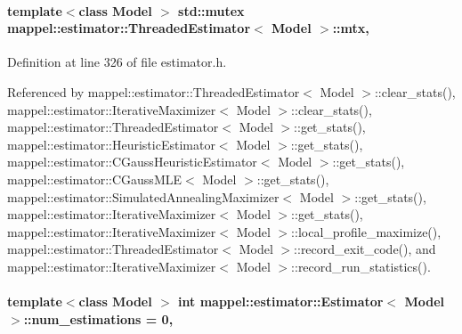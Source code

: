 \paragraph[{\texorpdfstring{mtx}{mtx}}]{\setlength{\rightskip}{0pt plus 5cm}template$<$class Model $>$ std\+::mutex {\bf mappel\+::estimator\+::\+Threaded\+Estimator}$<$ Model $>$\+::mtx\hspace{0.3cm}{\ttfamily [protected]}, {\ttfamily [inherited]}}\hypertarget{classmappel_1_1estimator_1_1ThreadedEstimator_af78695378590ff8e822dffe2b1b3f242}{}\label{classmappel_1_1estimator_1_1ThreadedEstimator_af78695378590ff8e822dffe2b1b3f242}


Definition at line 326 of file estimator.\+h.



Referenced by mappel\+::estimator\+::\+Threaded\+Estimator$<$ Model $>$\+::clear\+\_\+stats(), mappel\+::estimator\+::\+Iterative\+Maximizer$<$ Model $>$\+::clear\+\_\+stats(), mappel\+::estimator\+::\+Threaded\+Estimator$<$ Model $>$\+::get\+\_\+stats(), mappel\+::estimator\+::\+Heuristic\+Estimator$<$ Model $>$\+::get\+\_\+stats(), mappel\+::estimator\+::\+C\+Gauss\+Heuristic\+Estimator$<$ Model $>$\+::get\+\_\+stats(), mappel\+::estimator\+::\+C\+Gauss\+M\+L\+E$<$ Model $>$\+::get\+\_\+stats(), mappel\+::estimator\+::\+Simulated\+Annealing\+Maximizer$<$ Model $>$\+::get\+\_\+stats(), mappel\+::estimator\+::\+Iterative\+Maximizer$<$ Model $>$\+::get\+\_\+stats(), mappel\+::estimator\+::\+Iterative\+Maximizer$<$ Model $>$\+::local\+\_\+profile\+\_\+maximize(), mappel\+::estimator\+::\+Threaded\+Estimator$<$ Model $>$\+::record\+\_\+exit\+\_\+code(), and mappel\+::estimator\+::\+Iterative\+Maximizer$<$ Model $>$\+::record\+\_\+run\+\_\+statistics().

\paragraph[{\texorpdfstring{num\+\_\+estimations}{num_estimations}}]{\setlength{\rightskip}{0pt plus 5cm}template$<$class Model $>$ int {\bf mappel\+::estimator\+::\+Estimator}$<$ Model $>$\+::num\+\_\+estimations = 0\hspace{0.3cm}{\ttfamily [protected]}, {\ttfamily [inherited]}}\hypertarget{classmappel_1_1estimator_1_1Estimator_a9f5390f0ac3ee127ddcd90dc6f4fd889}{}\label{classmappel_1_1estimator_1_1Estimator_a9f5390f0ac3ee127ddcd90dc6f4fd889}


